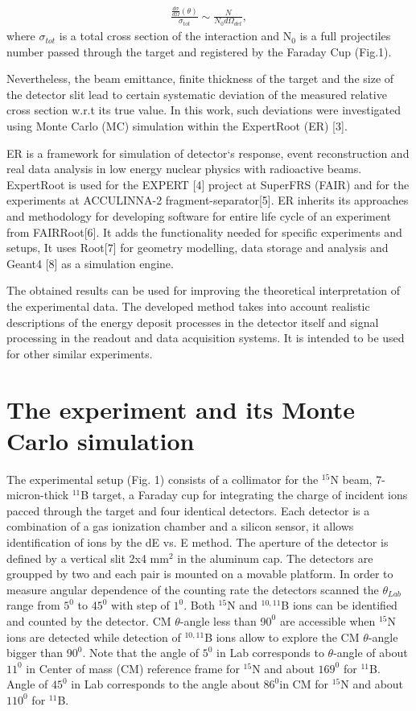 \documentclass[%
 aip,
cp,  %
 amsmath,amssymb,%
 reprint,%
]{revtex4-2}
\begin{document}
\begin{eqnarray}
 \frac{ \frac{d\sigma}{d\Omega}(\theta) }{\sigma_{tot}} \sim \frac{N}{N_0 d\Omega_{det}},
\end{eqnarray}
where
$\sigma$$_{tot}$ is a total cross section of the interaction
and N$_{0}$ is a full projectiles number passed through the target and registered by the Faraday Cup (Fig.1).

Nevertheless, the beam emittance, finite thickness of the target and the size of the detector slit lead to certain systematic deviation of the measured relative cross section w.r.t its true value. In this work, such deviations were investigated using Monte Carlo (MC) simulation within the ExpertRoot (ER) [3].

ER is a framework for simulation of detector`s response, event reconstruction and real data analysis in low energy nuclear physics with radioactive beams. ExpertRoot is used for the EXPERT [4] project at SuperFRS (FAIR) and for the experiments at ACCULINNA-2 fragment-separator[5].  ER inherits its approaches and methodology for developing software for entire life cycle of an experiment from FAIRRoot[6]. It adds the functionality needed for specific experiments and setups, It uses Root[7] for geometry modelling, data storage and analysis and Geant4 [8] as a simulation engine.

The obtained results can be used for improving the theoretical interpretation of the experimental data. The developed method takes into account realistic descriptions of the energy deposit processes in the detector itself and signal processing in the readout and data acquisition systems. It is intended to be used for other similar experiments.

\section{The experiment and its Monte Carlo simulation}

The experimental setup (Fig. 1) consists of a collimator for the ${}^{15}$N beam, 7-micron-thick ${}^{11}$B target, a Faraday cup for integrating the charge of incident ions pacced through the target and four identical detectors. Each detector is a combination of a gas ionization chamber and a silicon sensor, it allows identification of ions by the dE vs. E method. The aperture of the detector is defined by a vertical slit 2x4 mm$^2$ in the aluminum cap. The detectors are groupped by two and each pair is mounted on a movable platform. In order to measure angular dependence of the counting rate the detectors scanned the $\theta_{Lab}$ range  from $5 ^0$ to $45 ^0$ with step of $1^0$. Both ${}^{15}$N and ${}^{10,11}$B ions can be identified and counted by the detector. CM $\theta$-angle less than 9$0^0$  are accessible when ${}^{15}$N ions are detected while detection of ${}^{10,11}$B ions allow to explore the CM $\theta$-angle bigger than 9$0^0$. Note that the angle of $5 ^0$ in Lab corresponds to $\theta$-angle of about $11 ^0$ in Center of mass (CM) reference frame for $^{15}$N and about $169 ^0$ for $^{11}$B. Angle of $45 ^0$ in Lab corresponds to the angle about $86 ^{0}$in CM for $^{15}$N and about $110 ^0$ for ${}^{11}$B. 
\end{document}
